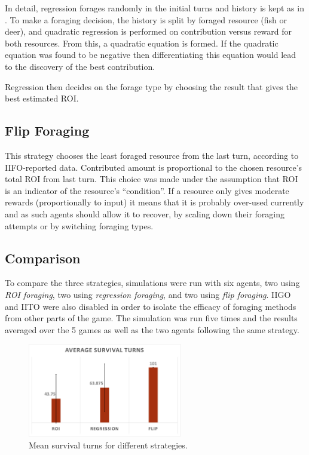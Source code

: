In detail, regression forages randomly in the initial turns and history is kept as in . To make a foraging decision, the history is split by foraged resource (fish or deer), and quadratic regression is performed on contribution versus reward for both resources. From this, a quadratic equation is formed. If the quadratic equation was found to be negative then differentiating this equation would lead to the discovery of the best contribution.

Regression then decides on the forage type by choosing the result that gives the best estimated ROI.

\subsection{Flip Foraging}

This strategy chooses the least foraged resource from the last turn, according to IIFO-reported data. Contributed amount is proportional to the chosen resource's total ROI from last turn. This choice was made under the assumption that ROI is an indicator of the resource's ``condition''. If a resource only gives moderate rewards (proportionally to input) it means that it is probably over-used currently and as such agents should allow it to recover, by scaling down their foraging attempts or by switching foraging types.

\subsection{Comparison}

To compare the three strategies, simulations were run with six agents, two using \emph{ROI foraging}, two using \emph{regression foraging}, and two using \emph{flip foraging}. IIGO and IITO were also disabled in order to isolate the efficacy of foraging methods from other parts of the game. The simulation was run five times and the results averaged over the 5 games as well as the two agents following the same strategy.

\begin{figure}[H] 
\centering
\includegraphics[width=0.6\textwidth]{09_team1_agentdesign/images/mean_survival_turns}
\caption{Mean survival turns for different strategies.}
\label{fig:team1:mean_survival}
\end{figure} 

